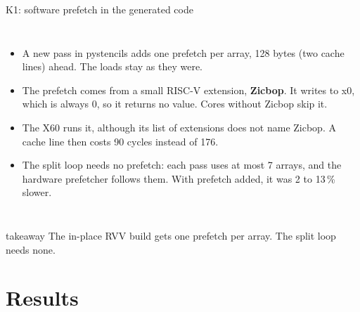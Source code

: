 \documentclass[aspectratio=169,10pt,t]{beamer}
\newcommand{\term}[1]{\textcolor{psblue!85!black}{\textbf{#1}}} %
\newcommand{\takeaway}[1]{\par\vfill
  \begin{beamercolorbox}[wd=\textwidth,sep=4pt,rounded=true]{takeaway}
    \small #1
  \end{beamercolorbox}}
\begin{document}
\begin{frame}{K1: software prefetch in the generated code}
  \begin{columns}[T,onlytextwidth]
    \vspace{4mm}
    
    \vspace{1mm}
    \begin{itemize}\small
      \item A new pass in pystencils adds one prefetch per array, 128 bytes (two cache lines) ahead. The loads
            stay as they were.
      \item The prefetch comes from a small RISC-V extension, \term{Zicbop}. It writes to x0, which is always 0,
            so it returns no value. Cores without Zicbop skip it.
      \item The X60 runs it, although its list of extensions does not name Zicbop. A cache line then costs 90
            cycles instead of 176.
      \item The split loop needs no prefetch: each pass uses at most 7 arrays, and the hardware prefetcher
            follows them. With prefetch added, it was 2 to 13\,\% slower.
    \end{itemize}
  \end{columns}
  \takeaway{The in-place RVV build gets one prefetch per array. The split loop needs none.}
\end{frame}
\section{Results}
\end{document}
